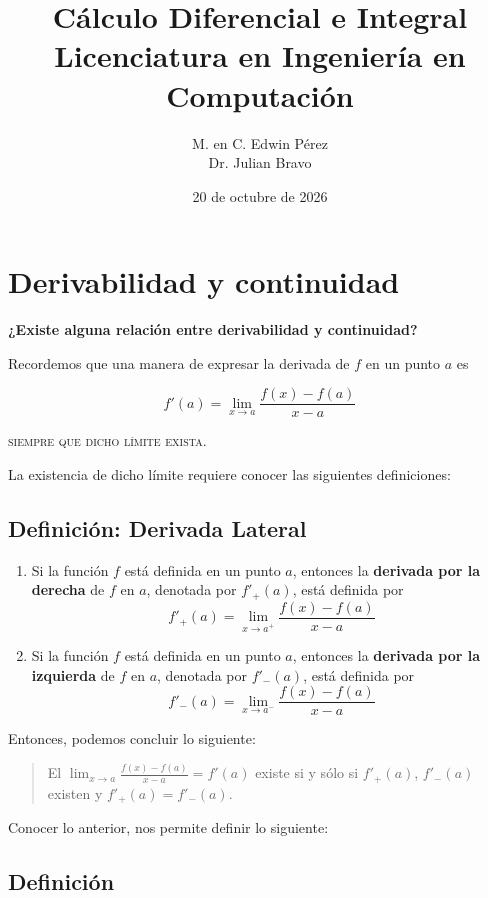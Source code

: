 \documentclass[12pt,tikz,border=5pt]{article}
\title{Cálculo Diferencial e Integral \\ \large Licenciatura en Ingeniería en Computación}
\author{M. en C. Edwin Pérez \\ Dr. Julian Bravo}
\date{20 de octubre de 2026}
\begin{document}
\maketitle

\section{Derivabilidad y continuidad}

\noindent \textbf{¿Existe alguna relación entre derivabilidad y continuidad?}

Recordemos que una manera de expresar la derivada de $f$ en un punto $a$ es

$$f'(a) = \lim_{x\to a} \frac{f(x)-f(a)}{x-a}$$

\textsc{siempre que dicho límite exista.}

La existencia de dicho límite requiere conocer las siguientes definiciones:

\subsection*{Definición: Derivada Lateral}

\begin{enumerate}[label=\alph*)]
\item Si la función $f$ está definida en un punto $a$, entonces la
\textbf{derivada por la derecha} de $f$ en $a$, denotada por $f'_+(a)$, está
definida por
$$f'_+(a) = \lim_{x\to a^+} \frac{f(x)-f(a)}{x-a}$$

\item Si la función $f$ está definida en un punto $a$, entonces la
\textbf{derivada por la izquierda} de $f$ en $a$, denotada por $f'_-(a)$,
está definida por
$$f'_-(a) = \lim_{x\to a^-} \frac{f(x)-f(a)}{x-a}$$
\end{enumerate}

Entonces, podemos concluir lo siguiente:

\begin{quote}
El $\displaystyle\lim_{x\to a}\frac{f(x)-f(a)}{x-a} = f'(a)$ existe si y
sólo si $f'_+(a)$, $f'_-(a)$ existen y $f'_+(a) = f'_-(a)$.
\end{quote}

Conocer lo anterior, nos permite definir lo siguiente:

\subsection*{Definición}
\end{document}
